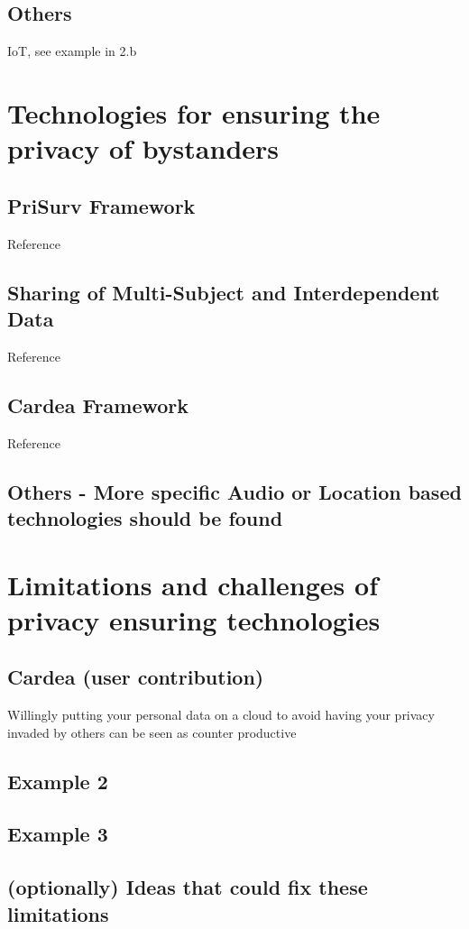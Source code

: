 \documentclass[conference]{IEEEtran}
\begin{document}
\subsection{Others}
IoT, see example in 2.b

\section{Technologies for ensuring the privacy of bystanders}

\subsection{PriSurv Framework}
Reference \cite{chinomi2008PriSurv}

\subsection{Sharing of Multi-Subject and Interdependent Data}
Reference \cite{olteanu2018consensual}

\subsection{Cardea Framework}
Reference \cite{shu2016cardea}

\subsection{Others - More specific Audio or Location based technologies should be found}


\section{Limitations and challenges of privacy ensuring technologies}
\subsection{Cardea (user contribution)}
Willingly putting your personal data on a cloud to avoid having your privacy invaded by others can be seen as counter productive
\subsection{Example 2}
\subsection{Example 3}
\subsection{(optionally) Ideas that could fix these limitations}
\end{document}
